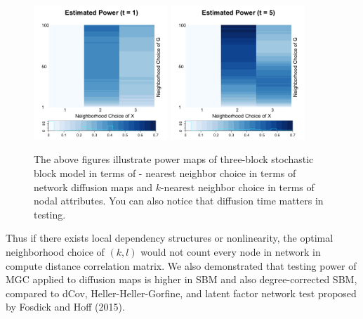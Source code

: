 \documentclass[simplex.tex]{subfiles}
\begin{document}
\begin{figure}[h!]
\begin{cframed}
\centering
\includegraphics[width=0.45\textwidth]{../../figs/msnt1.png}
\includegraphics[width=0.45\textwidth]{../../figs/msnt2.png}
\caption{
The above figures illustrate power maps of
three-block stochastic block model in terms of - nearest neighbor choice
in terms of network diffusion maps and $k$-nearest neighbor choice in
terms of nodal attributes. You can also notice that diffusion time
matters in testing. 
}
\label{fig:msnt}
\end{cframed}
\end{figure}

Thus if there exists
local dependency structures or nonlinearity, the optimal neighborhood
choice of $(k,l)$ would not count every node in network in compute
distance correlation matrix. We also demonstrated that testing power of MGC
applied to diffusion maps is higher in SBM and also degree-corrected
SBM, compared to dCov, Heller-Heller-Gorfine, and latent factor network
test proposed by Fosdick and Hoff (2015).
\end{document}
